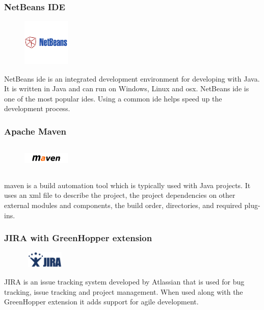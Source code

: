 \subsubsection{NetBeans IDE}
\begin{figure}
  \vspace{-35pt}
  \begin{center}
    \includegraphics[width=0.2\textwidth]{NetBeans}
  \end{center}

\end{figure}
NetBeans \gls{ide} is an integrated development environment for developing with Java. It is written in Java and can run on Windows, Linux and \gls{osx}. NetBeans \gls{ide} is one of the most popular \gls{ide}s. Using a common \gls{ide} helps speed up the development process.   

\subsubsection{Apache Maven}
\begin{figure}
  \vspace{-35pt}
  \begin{center}
    \includegraphics[width=0.2\textwidth, height=50px]{Maven}
  \end{center}

\end{figure}
\gls{maven} is a build automation tool which is typically used with Java projects. It uses an \gls{xml} file to describe the project, the project dependencies on other external modules and components, the build order, directories, and required plug-ins.   

\subsubsection{JIRA with GreenHopper extension}
\begin{figure}
  \vspace{-40pt}
  \begin{center}
    \includegraphics[width=80px,height=30px]{Jira}
  \end{center}

\end{figure}
JIRA is an issue tracking system developed by Atlassian that is used for bug tracking, issue tracking and project management. When used along with the GreenHopper extension it adds support for agile development.

